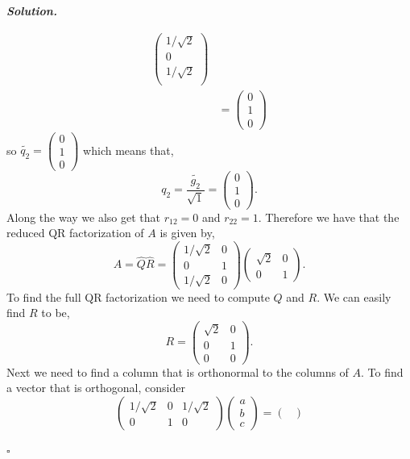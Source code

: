 \documentclass[12pt]{report}
\newenvironment{solution}[1][\it{Solution}]{\textbf{#1. } }{$\square$}
\begin{document}
\begin{solution}
\begin{enumerate}
\begin{align*}
\begin{pmatrix}
                1/\sqrt{2}\\0\\1/\sqrt{2}\\
            \end{pmatrix}\\
            &= \begin{pmatrix}
                0\\1\\0
            \end{pmatrix}
        \end{align*}
        so $\tilde{q_2} = \begin{pmatrix}
            0\\1\\0
        \end{pmatrix}$ which means that,
        \[ q_2 = \frac{\tilde{g_2}}{\sqrt{1}} = \begin{pmatrix}
            0\\1\\0
        \end{pmatrix}.\]
        Along the way we also get that $r_{12} = 0$ and $r_{22} = 1$. Therefore we have that the reduced QR factorization of $A$ is given by,
        \[A = \hat{Q}\hat{R} = \begin{pmatrix}
            1/\sqrt{2} & 0\\
            0 & 1\\
            1/\sqrt{2} & 0
        \end{pmatrix} \begin{pmatrix}
            \sqrt{2} & 0\\
            0 & 1
        \end{pmatrix}.\] 
        To find the full QR factorization we need to compute $Q$ and $R$. We can easily find $R$ to be,
        \[
            R = \begin{pmatrix}
                \sqrt{2}&0\\ 0&1\\ 0&0 
            \end{pmatrix}.
        \]
        Next we need to find a column that is orthonormal to the columns of $A$. To find a vector that is orthogonal, consider
        \[
            \begin{pmatrix}1/\sqrt{2}&0&1/\sqrt{2}\\0&1&0\end{pmatrix}\begin{pmatrix}a\\b\\c\end{pmatrix} = \begin{pmatrix}

\end{pmatrix}\]
\end{enumerate}
\end{solution}
\end{document}
